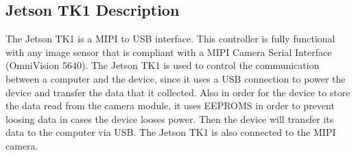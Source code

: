 \subsection{Jetson TK1 Description}
The Jetson TK1 is a MIPI to USB interface. This controller is fully functional with 
any image sensor that is compliant with a MIPI Camera Serial Interface (OmniVision 
5640). The Jetson TK1 is used to control the communication between a computer 
and the device, since it uses a USB connection to power the device and transfer the 
data that it collected. Also in order for the device to store the data read from the 
camera module, it uses EEPROMS in order to prevent loosing data in cases the 
device looses power. Then the device will transfer its data to the computer via USB. 
The Jetson TK1 is also connected to the MIPI camera.
